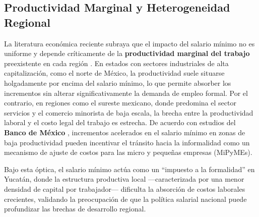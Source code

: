 \subsection{Productividad Marginal y Heterogeneidad Regional}
La literatura económica reciente subraya que el 
impacto del salario mínimo no es uniforme y depende 
críticamente de la \textbf{productividad marginal del trabajo} 
preexistente en cada región \citep{Neumark2021}. 
En estados con sectores industriales de alta 
capitalización, como el norte de México, la 
productividad suele situarse holgadamente por encima 
del salario mínimo, lo que permite absorber los 
incrementos sin alterar significativamente la demanda 
de empleo formal.
Por el contrario, en regiones como el sureste 
mexicano, donde predomina el sector servicios y 
el comercio minorista de baja escala, la brecha 
entre la productividad laboral y el costo legal del 
trabajo es estrecha. De acuerdo con estudios del 
\textbf{Banco de México} \citep{Banxico2022}, 
incrementos acelerados en el salario mínimo en zonas 
de baja productividad pueden incentivar el tránsito 
hacia la informalidad como un mecanismo de ajuste 
de costos para las micro y pequeñas empresas (MiPyMEs). 

Bajo esta óptica, el salario mínimo 
actúa como un ``impuesto a la formalidad'' 
en Yucatán, donde la estructura productiva 
local —caracterizada por una menor densidad de 
capital por trabajador— dificulta la absorción 
de costos laborales crecientes, validando la 
preocupación de que la política salarial nacional 
puede profundizar las brechas de desarrollo regional.